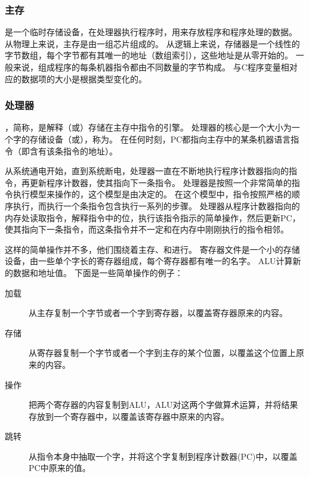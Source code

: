 {{        \subsubsection{主存}
        {
            是一个临时存储设备，在处理器执行程序时，用来存放程序和程序处理的数据。
            从物理上来说，主存是由一组芯片组成的。
            从逻辑上来说，存储器是一个线性的字节数组，每个字节都有其唯一的地址（数组索引），这些地址是从零开始的。
            一般来说，组成程序的每条机器指令都由不同数量的字节构成。
            与C程序变量相对应的数据项的大小是根据类型变化的。
        }

        \subsubsection{处理器}
        {
            ，简称，是解释（或）存储在主存中指令的引擎。
            处理器的核心是一个大小为一个字的存储设备（或），称为。
            在任何时刻，PC都指向主存中的某条机器语言指令（即含有该条指令的地址）。

            从系统通电开始，直到系统断电，处理器一直在不断地执行程序计数器指向的指令，再更新程序计数器，使其指向下一条指令。
            处理器是按照一个非常简单的指令执行模型来操作的，这个模型是由决定的。
            在这个模型中，指令按照严格的顺序执行，而执行一个条指令包含执行一系列的步骤。
            处理器从程序计数器指向的内存处读取指令，解释指令中的位，执行该指令指示的简单操作，然后更新PC，使其指向下一条指令，而这条指令并不一定和在内存中刚刚执行的指令相邻。

            这样的简单操作并不多，他们围绕着主存、和进行。
            寄存器文件是一个小的存储设备，由一些单个字长的寄存器组成，每个寄存器都有唯一的名字。
            ALU计算新的数据和地址值。
            下面是一些简单操作的例子：

            \begin{description}
                \item[加载] 从主存复制一个字节或者一个字到寄存器，以覆盖寄存器原来的内容。
                \item[存储] 从寄存器复制一个字节或者一个字到主存的某个位置，以覆盖这个位置上原来的内容。
                \item[操作] 把两个寄存器的内容复制到ALU，ALU对这两个字做算术运算，并将结果存放到一个寄存器中，以覆盖该寄存器中原来的内容。
                \item[跳转] 从指令本身中抽取一个字，并将这个字复制到程序计数器(PC)中，以覆盖PC中原来的值。
            \end{description}

}}}
